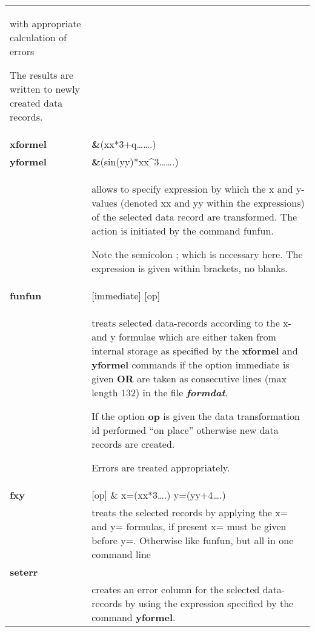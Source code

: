 \documentclass[]{article}
\begin{document}
\begin{longtable}[]{@{}ll@{}}
\begin{minipage}[t]{0.47\columnwidth}
with appropriate calculation of errors

The results are written to newly created data records.\strut
\end{minipage}\tabularnewline
\textbf{xformel} & \textbf{\&}(xx*3+q\ldots{}\ldots{}.)\tabularnewline
\textbf{yformel} &
\textbf{\&}(sin(yy)*xx\^{}3\ldots{}\ldots{}.)\tabularnewline
\begin{minipage}[t]{0.47\columnwidth}\raggedright
\strut
\end{minipage} & \begin{minipage}[t]{0.47\columnwidth}\raggedright
allows to specify expression by which the x and y-values (denoted xx and
yy within the expressions) of the selected data record are transformed.
The action is initiated by the command funfun.

Note the semicolon ; which is necessary here. The expression is given
within brackets, no blanks.\strut
\end{minipage}\tabularnewline
\textbf{funfun} & {[}immediate{]} {[}op{]}\tabularnewline
\begin{minipage}[t]{0.47\columnwidth}\raggedright
\strut
\end{minipage} & \begin{minipage}[t]{0.47\columnwidth}\raggedright
treats selected data-records according to the x- and y formulae which
are either taken from internal storage as specified by the
\textbf{xformel} and \textbf{yformel} commands if the option immediate
is given \textbf{OR} are taken as consecutive lines (max length 132) in
the file \emph{\textbf{formdat}}.

If the option \textbf{op} is given the data transformation id performed
``on place'' otherwise new data records are created.

Errors are treated appropriately.\strut
\end{minipage}\tabularnewline
\textbf{fxy} & {[}op{]} \& x=(xx*3\ldots{}.)
y=(yy+4\ldots{}.)\tabularnewline
& treats the selected records by applying the x= and y= formulas, if
present x= must be given before y=. Otherwise like funfun, but all in
one command line\tabularnewline
\textbf{seterr} &\tabularnewline
& creates an error column for the selected data-records by using the
expression specified by the command \textbf{yformel}.\tabularnewline
\bottomrule
\end{longtable}

\hypertarget{section-1}{%
\subsubsection{}\label{section-1}}
\end{document}
